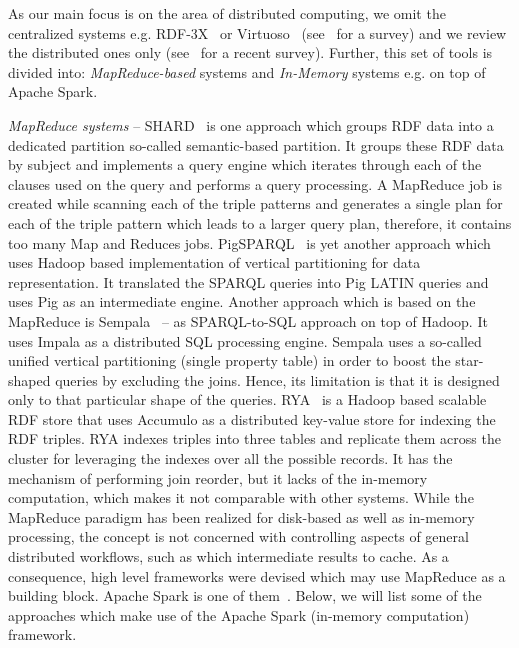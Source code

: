 As our main focus is on the area of distributed computing, we omit the centralized systems e.g. RDF-3X~\cite{Neumann2008RRE} or Virtuoso~\cite{Erling2010} (see~\cite{faye2012survey} for a survey) and we review the distributed ones only (see~\cite{kaoudi2015rdf} for a recent survey).
Further, this set of tools is divided into: \textit{MapReduce-based} systems and \textit{In-Memory} systems e.g. on top of Apache Spark.

\textit{MapReduce systems} -- SHARD~\cite{Rohloff2010} is one approach which groups RDF data into a dedicated partition so-called semantic-based partition. 
It groups these RDF data by subject and implements a query engine which iterates through each of the clauses used on the query and performs a query processing.
A MapReduce job is created while scanning each of the triple patterns and generates a single plan for each of the triple pattern which leads to a larger query plan, therefore, it contains too many Map and Reduces jobs.
PigSPARQL~\cite{Schatzle2011PMS} is yet another approach which uses Hadoop based implementation of vertical partitioning for data representation. 
It translated the SPARQL queries into Pig LATIN queries and uses Pig as an intermediate engine.
Another approach which is based on the MapReduce is Sempala~\cite{Schatzle2014Sempala} -- as SPARQL-to-SQL approach on top of Hadoop.
It uses Impala as a distributed SQL processing engine.
Sempala uses a so-called unified vertical partitioning (single property table) in order to boost the star-shaped queries by excluding the joins.
Hence, its limitation is that it is designed only to that particular shape of the queries.
RYA~\cite{Punnoose2012Rya} is a Hadoop based scalable RDF store that uses Accumulo as a distributed key-value store for indexing the RDF triples.
RYA indexes triples into three tables and replicate them across the cluster for leveraging the indexes over all the possible records.
It has the mechanism of performing join reorder, but it lacks of the in-memory computation, which makes it not comparable with other systems.
While the MapReduce paradigm has been realized for disk-based as well as in-memory processing, the concept is not concerned with controlling aspects of general distributed workflows, such as which intermediate results to cache. As a consequence, high level frameworks were devised which may use MapReduce as a building block.%
Apache Spark is one of them~\cite{zaharia2012resilient}.
Below, we will list some of the approaches which make use of the Apache Spark (in-memory computation) framework. 

